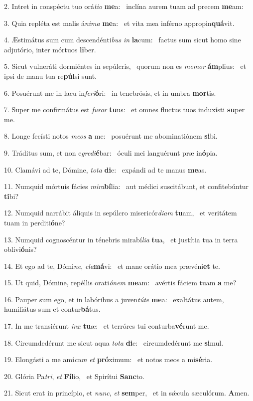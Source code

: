 2. Intret in conspéctu tuo orá\textit{ti}\textit{o} \textbf{me}a: \ast\  inclína aurem tuam ad precem \textbf{me}am:\

3. Quia repléta est malis á\textit{ni}\textit{ma} \textbf{me}a: \ast\  et vita mea inférno appropin\textbf{quá}vit.\

4. Æstimátus sum cum descendénti\textit{bus} \textit{in} \textbf{la}cum: \ast\  factus sum sicut homo sine adjutório, inter mórtuos \textbf{li}ber.\

5. Sicut vulneráti dormiéntes in sepúlcris, \dag\  quorum non es \textit{me}\textit{mor} \textbf{ám}plius: \ast\  et ipsi de manu tua re\textbf{púl}si sunt.\

6. Posuérunt me in lacu in\textit{fe}\textit{ri}\textbf{ó}ri: \ast\  in tenebrósis, et in umbra \textbf{mor}tis.\

7. Super me confirmátus est \textit{fu}\textit{ror} \textbf{tu}us: \ast\  et omnes fluctus tuos induxísti \textbf{su}per me.\

8. Longe fecísti notos \textit{me}\textit{os} \textbf{a} me: \ast\  posuérunt me abominatiónem \textbf{si}bi.\

9. Tráditus sum, et non e\textit{gre}\textit{di}\textbf{é}bar: \ast\  óculi mei languérunt præ in\textbf{ó}pia.\

10. Clamávi ad te, Dómine, \textit{to}\textit{ta} \textbf{di}e: \ast\  expándi ad te manus \textbf{me}as.\

11. Numquid mórtuis fácies \textit{mi}\textit{ra}\textbf{bí}lia: \ast\  aut médici suscitábunt, et confitebúntur \textbf{ti}bi?\

12. Numquid narrábit áliquis in sepúlcro misericór\textit{di}\textit{am} \textbf{tu}am, \ast\  et veritátem tuam in perditi\textbf{ó}ne?\

13. Numquid cognoscéntur in ténebris mirabí\textit{li}\textit{a} \textbf{tu}a, \ast\  et justítia tua in terra oblivi\textbf{ó}nis?\

14. Et ego ad te, Dómi\textit{ne}, \textit{cla}\textbf{má}vi: \ast\  et mane orátio mea prævéni\textbf{et} te.\

15. Ut quid, Dómine, repéllis orati\textit{ó}\textit{nem} \textbf{me}am: \ast\  avértis fáciem tuam \textbf{a} me?\

16. Pauper sum ego, et in labóribus a juven\textit{tú}\textit{te} \textbf{me}a: \ast\  exaltátus autem, humiliátus sum et contur\textbf{bá}tus.\

17. In me transiérunt \textit{i}\textit{ræ} \textbf{tu}æ: \ast\  et terróres tui conturba\textbf{vé}runt me.\

18. Circumdedérunt me sicut aqua \textit{to}\textit{ta} \textbf{di}e: \ast\  circumdedérunt me \textbf{si}mul.\

19. Elongásti a me amí\textit{cum} \textit{et} \textbf{pró}ximum: \ast\  et notos meos a mi\textbf{sé}ria.\

20. Glória Pa\textit{tri}, \textit{et} \textbf{Fí}lio, \ast\  et Spirítui \textbf{Sanc}to.\

21. Sicut erat in princípio, et \textit{nunc}, \textit{et} \textbf{sem}per, \ast\  et in sǽcula sæculórum. \textbf{A}men.\

